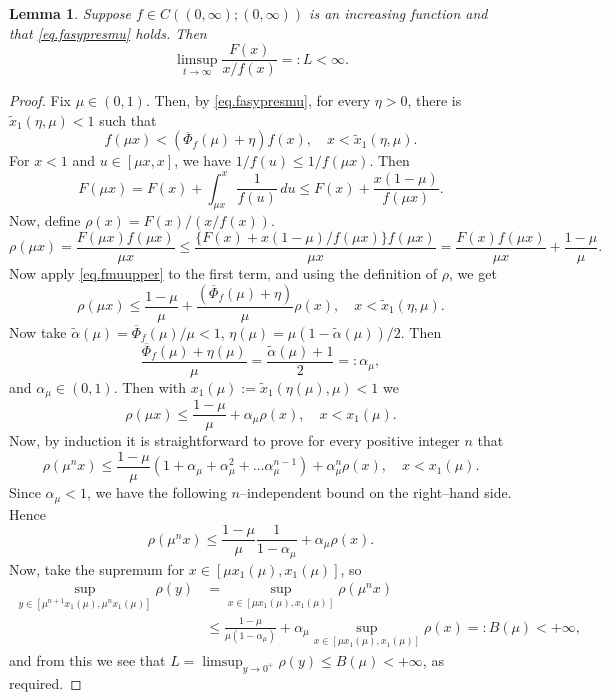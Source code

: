 \documentclass[a4paper,10pt,reqno]{amsart}
\numberwithin{equation}{section}
\newtheorem{lemma}{Lemma}
\theoremstyle{definition}
\theoremstyle{remark}
\DeclareMathOperator{\1}{\mathbbm 1}
\begin{document}
	\begin{lemma} \label{lem.importfapFinv}
		Suppose $f\in C((0,\infty);(0,\infty))$ is an increasing function and that \eqref{eq.fasypresmu} holds. Then 
		\[
		\limsup_{t\to\infty} \frac{F(x)}{x/f(x)}=:L<\infty.
		\]
	\end{lemma}
	\begin{proof}
		Fix $\mu\in (0,1)$. Then, by \eqref{eq.fasypresmu}, for every $\eta>0$, there is $\tilde{x}_1(\eta,\mu)<1$ such that 
		\begin{equation} \label{eq.fmuupper}
			f(\mu x)<(\overline{\Phi}_f(\mu)+\eta)f(x), \quad x<\tilde{x}_1(\eta,\mu).
		\end{equation}
		For $x<1$ and $u\in [\mu x,x]$, we have $1/f(u)\leq 1/f(\mu x)$.
		Then 
		\[
		F(\mu x)=F(x)+\int_{\mu x}^x\frac{1}{f(u)}\,du\leq F(x)+\frac{x(1-\mu)}{f(\mu x)}.
		\]	
		Now, define $\rho(x)=F(x)/(x/f(x))$. 
		\[
		\rho(\mu x)=\frac{F(\mu x) f(\mu x)}{\mu x}
		\leq \frac{\{F(x)+x(1-\mu)/f(\mu x)\}  f(\mu x)}{\mu x}
		=\frac{F(x)f(\mu x)}{\mu x}+\frac{1-\mu}{\mu}.
		\]
		Now apply \eqref{eq.fmuupper} to the first term, and using the definition of $\rho$, we get 
		\[
		\rho(\mu x)\leq \frac{1-\mu}{\mu}+\frac{(\overline{\Phi}_f(\mu)+\eta)}{\mu}\rho(x), \quad x<\tilde{x}_1(\eta,\mu).
		\]
		Now take $\tilde{\alpha}(\mu)=\overline{\Phi}_f(\mu)/\mu<1$,  $\eta(\mu)=\mu(1-\tilde{\alpha}(\mu))/2$. Then 
		\[
		\frac{\overline{\Phi}_f(\mu)+\eta(\mu)}{\mu}=\frac{\tilde{\alpha}(\mu)+1}{2}
		=:\alpha_\mu,
		\]
		and $\alpha_\mu\in (0,1)$. Then with $x_1(\mu):=\tilde{x}_1(\eta(\mu),\mu)<1$ we 
		\begin{equation} \label{eq.rhomuxrhox}
			\rho(\mu x)\leq \frac{1-\mu}{\mu}+\alpha_\mu\rho(x), \quad x<x_1(\mu).
		\end{equation}
		Now, by induction it is straightforward to prove for every positive integer $n$ that 
		\[
		\rho(\mu^n x)\leq \frac{1-\mu}{\mu}(1+\alpha_\mu+\alpha_\mu^2+\ldots\alpha_\mu^{n-1})+\alpha_\mu^n \rho(x), \quad x<x_1(\mu).
		\]
		Since $\alpha_\mu<1$, we have the following $n$--independent bound on the right--hand side. Hence 
		\[
		\rho(\mu^n x)\leq \frac{1-\mu}{\mu}\frac{1}{1-\alpha_\mu}+\alpha_\mu \rho(x).
		\]
		Now, take the supremum for $x\in [\mu x_1(\mu),x_1(\mu)]$, so 
		\begin{align*}
			\sup_{y\in [\mu^{n+1}x_1(\mu),\mu^n x_1(\mu)]} \rho(y)
			&=\sup_{x\in [\mu x_1(\mu),x_1(\mu)]} \rho(\mu^n x)\\
			&\leq \frac{1-\mu}{\mu(1-\alpha_\mu)}+\alpha_\mu \sup_{x\in [\mu x_1(\mu),x_1(\mu)]} \rho(x) =: B(\mu)<+\infty,
		\end{align*}
		and from this we see that $L=\limsup_{y\to 0^+} \rho(y)\leq B(\mu)<+\infty$, as required.
	\end{proof}
	
\end{document}
